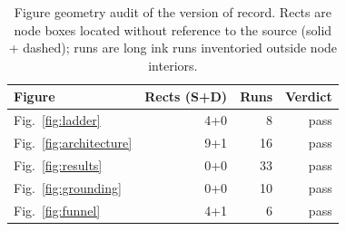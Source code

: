 \begin{table}[!t]
\centering
\caption{Figure geometry audit of the version of record. Rects are node
boxes located without reference to the source (solid + dashed); runs are
long ink runs inventoried outside node interiors.}
\label{tab:figaudit}
\scriptsize
\setlength{\tabcolsep}{4pt}
\begin{tabular}{lrrr}
\toprule
Figure & Rects (S+D) & Runs & Verdict \\
\midrule
Fig.~\ref{fig:ladder} & 4+0 & 8 & pass \\
Fig.~\ref{fig:architecture} & 9+1 & 16 & pass \\
Fig.~\ref{fig:results} & 0+0 & 33 & pass \\
Fig.~\ref{fig:grounding} & 0+0 & 10 & pass \\
Fig.~\ref{fig:funnel} & 4+1 & 6 & pass \\
\bottomrule
\end{tabular}
\end{table}
